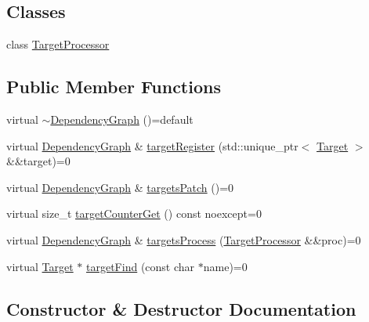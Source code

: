 \subsection*{Classes}
\begin{DoxyCompactItemize}
\item 
class \hyperlink{class_maike_1_1_dependency_graph_1_1_target_processor}{Target\+Processor}
\end{DoxyCompactItemize}
\subsection*{Public Member Functions}
\begin{DoxyCompactItemize}
\item 
virtual \hyperlink{class_maike_1_1_dependency_graph_a1ebc7a3ae113077b51d87f59f8f8ec65}{$\sim$\+Dependency\+Graph} ()=default
\item 
virtual \hyperlink{class_maike_1_1_dependency_graph}{Dependency\+Graph} \& \hyperlink{class_maike_1_1_dependency_graph_a6c0c5e99fc930156123366b529310436}{target\+Register} (std\+::unique\+\_\+ptr$<$ \hyperlink{class_maike_1_1_target}{Target} $>$ \&\&target)=0
\item 
virtual \hyperlink{class_maike_1_1_dependency_graph}{Dependency\+Graph} \& \hyperlink{class_maike_1_1_dependency_graph_a49ac42d37065fd3c976e5ec9966816a8}{targets\+Patch} ()=0
\item 
virtual size\+\_\+t \hyperlink{class_maike_1_1_dependency_graph_a38f551d19ac653287bc12c6a449d44a0}{target\+Counter\+Get} () const noexcept=0
\item 
virtual \hyperlink{class_maike_1_1_dependency_graph}{Dependency\+Graph} \& \hyperlink{class_maike_1_1_dependency_graph_a8a9a603b3d0d7c62241510b8d59a9711}{targets\+Process} (\hyperlink{class_maike_1_1_dependency_graph_1_1_target_processor}{Target\+Processor} \&\&proc)=0
\item 
virtual \hyperlink{class_maike_1_1_target}{Target} $\ast$ \hyperlink{class_maike_1_1_dependency_graph_a45c5920ffc7b6500382171c700d9f6d4}{target\+Find} (const char $\ast$name)=0
\end{DoxyCompactItemize}


\subsection{Constructor \& Destructor Documentation}
